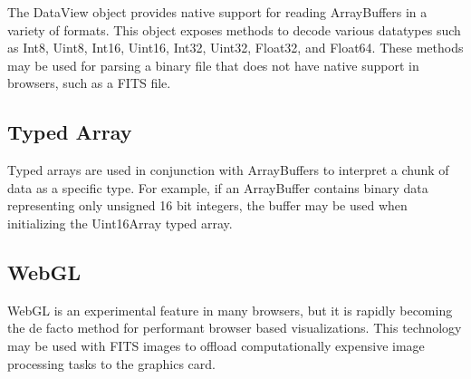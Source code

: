 \documentclass[11pt,twoside]{article}
\begin{document}
The DataView \citep{KhronosTypedArray} object provides native support for reading ArrayBuffers in a variety of formats.  This object exposes methods to decode various datatypes such as Int8, Uint8, Int16, Uint16, Int32, Uint32, Float32, and Float64.  These methods may be used for parsing a binary file that does not have native support in browsers, such as a FITS file.

\subsection{Typed Array}

Typed arrays \citep{KhronosTypedArray} are used in conjunction with ArrayBuffers to interpret a chunk of data as a specific type.  For example, if an ArrayBuffer contains binary data representing only unsigned 16 bit integers, the buffer may be used when initializing the Uint16Array typed array.

\subsection{WebGL}

WebGL \citep{KhronosWebGL} is an experimental feature in many browsers, but it is rapidly becoming the de facto method for performant browser based visualizations.  This technology may be used with FITS images to offload computationally expensive image processing tasks to the graphics card.


\end{document}
